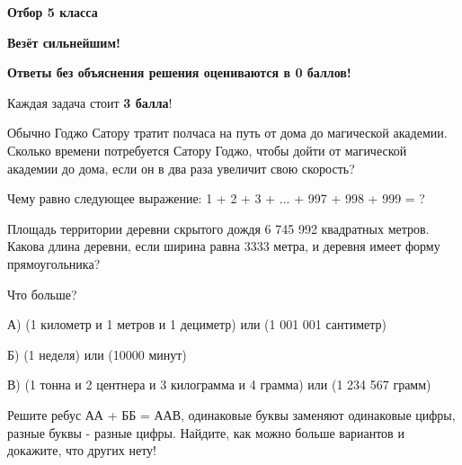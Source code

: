 \centerline{\bf \Huge Отбор 5 класса}

\begin{flushright}
        \scriptsize{\textbf{Везёт сильнейшим!}}
\end{flushright}
\textbf{Ответы без объяснения решения оцениваются в 0 баллов!}

Каждая задача стоит \textbf{3 балла}!

 Обычно Годжо Сатору тратит полчаса на путь от дома до магической академии. Сколько времени потребуется Сатору Годжо, чтобы дойти от магической академии до дома, если он в два раза увеличит свою скорость?

 Чему равно следующее выражение: 1 + 2 + 3 + ... + 997 + 998 + 999 = ?

 Площадь территории деревни скрытого дождя 6 745 992 квадратных метров. Какова длина деревни, если ширина равна 3333 метра, и деревня имеет форму прямоугольника?

 Что больше?

А) (1 километр и 1 метров и 1 дециметр) или (1 001 001 сантиметр)

Б) (1 неделя) или (10000 минут)

В) (1 тонна и 2 центнера и 3 килограмма и 4 грамма) или (1 234 567 грамм)

 Решите ребус АА + ББ = ААВ, одинаковые буквы заменяют одинаковые цифры, разные буквы - разные цифры. Найдите, как можно больше вариантов и докажите, что других нету!

